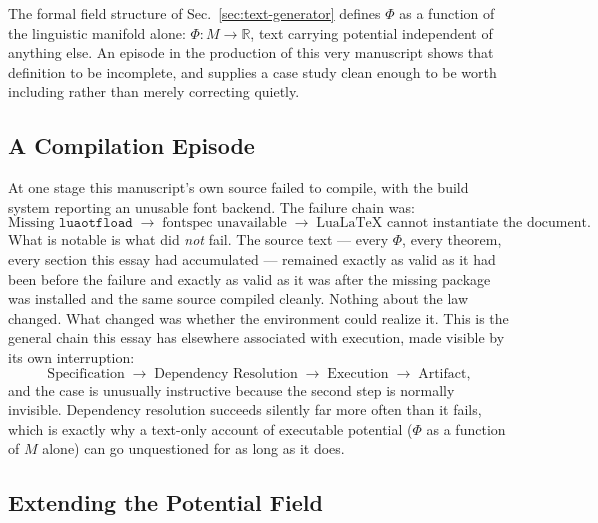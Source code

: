 \documentclass[12pt,a4paper]{article}
\theoremstyle{plain}
\theoremstyle{definition}
\theoremstyle{remark}
\newcommand{\Phifield}{\Phi}
\begin{document}
The formal field structure of Sec.~\ref{sec:text-generator} defines $\Phifield$ as a function of the linguistic manifold alone: $\Phifield: M \to \mathbb{R}$, text carrying potential independent of anything else. An episode in the production of this very manuscript shows that definition to be incomplete, and supplies a case study clean enough to be worth including rather than merely correcting quietly.

\subsection{A Compilation Episode}
\label{subsec:compile-episode}

At one stage this manuscript's own source failed to compile, with the build system reporting an unusable font backend. The failure chain was:
\[
\text{Missing } \texttt{luaotfload} \;\longrightarrow\; \text{fontspec unavailable} \;\longrightarrow\; \text{LuaLaTeX cannot instantiate the document}.
\]
What is notable is what did \emph{not} fail. The source text — every $\Phifield$, every theorem, every section this essay had accumulated — remained exactly as valid as it had been before the failure and exactly as valid as it was after the missing package was installed and the same source compiled cleanly. Nothing about the law changed. What changed was whether the environment could realize it. This is the general chain this essay has elsewhere associated with execution, made visible by its own interruption:
\[
\text{Specification} \;\to\; \text{Dependency Resolution} \;\to\; \text{Execution} \;\to\; \text{Artifact},
\]
and the case is unusually instructive because the second step is normally invisible. Dependency resolution succeeds silently far more often than it fails, which is exactly why a text-only account of executable potential ($\Phifield$ as a function of $M$ alone) can go unquestioned for as long as it does.

\subsection{Extending the Potential Field}
\label{subsec:extending-potential}
\end{document}
